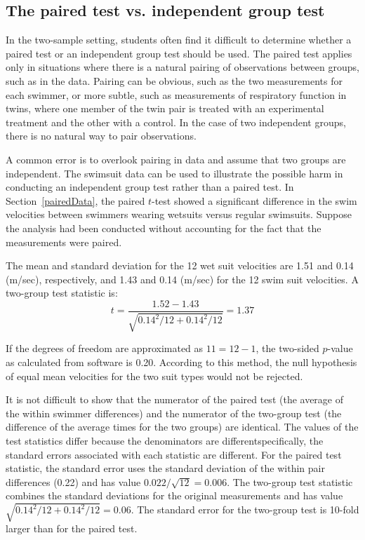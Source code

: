 \subsection{The paired test vs. independent group test}
\label{pairedVsTwoGroups}

In the two-sample setting, students often find it difficult to determine whether a paired test or an independent group test should be used.  The paired test applies only in situations where there is a natural pairing of observations between groups, such as in the  data. Pairing can be obvious, such as the two measurements for each swimmer, or more subtle, such as measurements of respiratory function in twins, where one member of the twin pair is treated with an experimental treatment and the other with a control. In the case of two independent groups, there is no natural way to pair observations.

A common error is to overlook pairing in data and assume that two groups are independent. The swimsuit data can be used to illustrate the possible harm in conducting an independent group test rather than a paired test. In Section~\ref{pairedData}, the paired $t$-test showed a significant difference in the swim velocities between swimmers wearing wetsuits versus regular swimsuits. Suppose the analysis had been conducted without accounting for the fact that the measurements were paired.


The mean and standard deviation for the 12 wet suit velocities are 1.51 and 0.14 (m/sec), respectively, and 1.43 and 0.14 (m/sec) for the 12 swim suit velocities. A two-group test statistic is:
\[t = \frac{1.52 - 1.43}{\sqrt{0.14^2/12 + 0.14^2/12}} = 1.37 \]

If the degrees of freedom are approximated as $11 = 12 - 1$, the two-sided $p$-value as calculated from software is 0.20. According to this method, the null hypothesis of equal mean velocities for the two suit types would not be rejected.

It is not difficult to show that the numerator of the paired test (the average of the within swimmer differences) and the numerator of the two-group test (the difference of the average times for the two groups) are identical. The values of the test statistics differ because the denominators are different\textemdash specifically, the standard errors associated with each statistic are different.  For the paired test statistic, the standard error uses the standard deviation of the within pair differences (0.22) and has value $0.022/\sqrt{12} = 0.006$. The two-group test statistic combines the standard deviations for the original measurements and has value $\sqrt{0.14^2/12 + 0.14^2/12} = 0.06$.  The standard error for the two-group test is 10-fold larger than for the paired test.  

